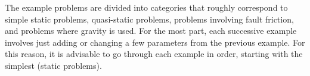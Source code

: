 The example problems are divided into categories that roughly correspond
to simple static problems, quasi-static problems, problems involving
fault friction, and problems where gravity is used. For the most part,
each successive example involves just adding or changing a few parameters
from the previous example. For this reason, it is advisable to go
through each example in order, starting with the simplest (static
problems).



%
%
%
%
%

